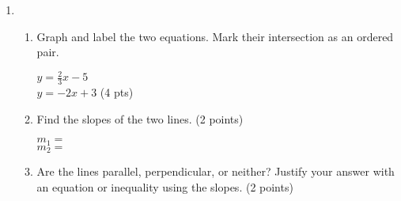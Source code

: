 \documentclass[12pt, twoside]{article}
\begin{document}
\begin{enumerate}
\newpage
  \item \begin{enumerate}
    \item Graph and label the two equations. Mark their intersection as an ordered pair.
      \begin{multicols}{2}
        $y =\frac{2}{3}x-5$ \\
        $y=-2x+3$ \hfill (4 pts)
      \end{multicols}     \vspace{1.5cm}
    \item Find the slopes of the two lines. \hfill (2 points)
      \begin{multicols}{2}
        $m_1=$ \\
        $m_2=$
      \end{multicols}
    \item Are the lines parallel, perpendicular, or neither? Justify your answer with an equation or inequality using the slopes. \hfill (2 points)
    \vspace{1.5cm}
  \end{enumerate}
    \begin{center}
    \end{center}
  
\end{enumerate}
\end{document}
